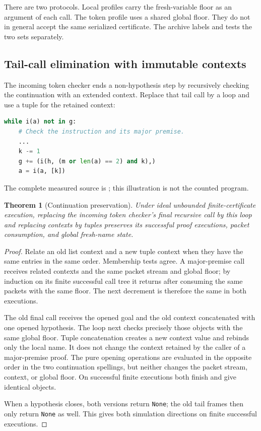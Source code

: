 \documentclass[11pt,letterpaper]{article}
\newtheorem{theorem}{Theorem}[section]
\theoremstyle{definition}\newtheorem{definition}[theorem]{Definition}
\theoremstyle{remark}\newtheorem{remark}[theorem]{Remark}
\newcommand{\file}[1]{{\small\path{#1}}}
\begin{document}
There are two protocols. Local profiles carry the fresh-variable floor
as an argument of each call. The token profile uses a shared global floor.
They do not in general accept the same serialized certificate. The archive
labels and tests the two sets separately.

\subsection{Tail-call elimination with immutable contexts}

The incoming token checker ends a non-hypothesis step by recursively checking
the continuation with an extended context. Replace that tail call by a loop
and use a tuple for the retained context:
\begin{lstlisting}[language=Python]
while i(a) not in g:
    # Check the instruction and its major premise.
    ...
    k -= 1
    g += (i(h, (m or len(a) == 2) and k),)
    a = i(a, [k])
\end{lstlisting}
The complete measured source is \file{code/checker_tokens.py}; this
illustration is not the counted program.

\begin{theorem}[Continuation preservation]
Under ideal unbounded finite-certificate execution, replacing the incoming
token checker's final recursive call by this loop and replacing contexts by
tuples preserves its successful proof executions, packet consumption, and
global fresh-name state.
\end{theorem}
\begin{proof}
Relate an old list context and a new tuple context when they have the same
entries in the same order. Membership tests agree. A major-premise call
receives related contexts and the same packet stream and global floor;
by induction on its finite successful call tree it returns after consuming
the same packets with the same floor. The next decrement is therefore the
same in both executions.

The old final call receives the opened goal and the old context concatenated
with one opened hypothesis. The loop next checks precisely those objects
with the same global floor. Tuple concatenation creates a new context value
and rebinds only the local name. It does not change the context retained by
the caller of a major-premise proof. The pure opening operations are
evaluated in the opposite order in the two continuation spellings, but
neither changes the packet stream, context, or global floor. On successful
finite executions both finish and give identical objects.

When a hypothesis closes, both versions return \texttt{None}; the old tail
frames then only return \texttt{None} as well. This gives both simulation
directions on finite successful executions.
\end{proof}
\end{document}
